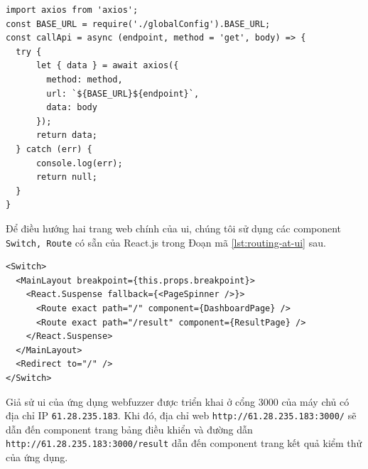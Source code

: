 \begin{lstlisting}[style=ES6, label={lst:call-API-from-UI}, caption={Gọi API từ mã nguồn UI}]
import axios from 'axios';
const BASE_URL = require('./globalConfig').BASE_URL;
const callApi = async (endpoint, method = 'get', body) => {
  try {
      let { data } = await axios({
        method: method,
        url: `${BASE_URL}${endpoint}`,
        data: body
      });
      return data;
  } catch (err) {
      console.log(err);
      return null;
  }
}
\end{lstlisting}
Để điều hướng hai trang web chính của \acrshort{ui}, chúng tôi sử dụng các component \texttt{Switch, Route} có sẵn của React.js trong Đoạn mã \ref{lst:routing-at-ui} sau.
\begin{lstlisting}[style=ES6, label={lst:routing-at-ui}, caption={Điều hướng các trang web trên \acrshort{ui} của webfuzzer}]
<Switch>
  <MainLayout breakpoint={this.props.breakpoint}>
    <React.Suspense fallback={<PageSpinner />}>
      <Route exact path="/" component={DashboardPage} />
      <Route exact path="/result" component={ResultPage} />
    </React.Suspense>
  </MainLayout>
  <Redirect to="/" />
</Switch>
\end{lstlisting}
Giả sử \acrshort{ui} của ứng dụng webfuzzer được triển khai ở cổng 3000 của máy chủ có địa chỉ IP \texttt{61.28.235.183}. Khi đó, địa chỉ web \texttt{http://61.28.235.183:3000/} sẽ dẫn đến component trang bảng điều khiển và đường dẫn \texttt{http://61.28.235.183:3000/result} dẫn đến component trang kết quả kiểm thử của ứng dụng.

